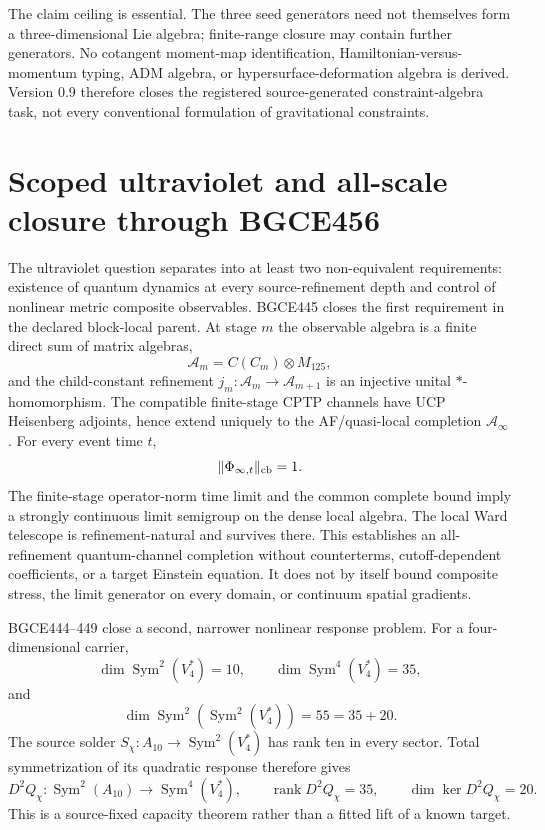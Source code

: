 \documentclass[11pt]{article}
\theoremstyle{definition}
\theoremstyle{remark}
\newcommand{\Sym}{\operatorname{Sym}}
\begin{document}
The claim ceiling is essential. The three seed generators need not themselves form a three-dimensional Lie algebra; finite-range closure may contain further generators. No cotangent moment-map identification, Hamiltonian-versus-momentum typing, ADM algebra, or hypersurface-deformation algebra is derived. Version 0.9 therefore closes the registered source-generated constraint-algebra task, not every conventional formulation of gravitational constraints.

\section{Scoped ultraviolet and all-scale closure through BGCE456}\label{sec:uv09}

The ultraviolet question separates into at least two non-equivalent requirements: existence of quantum dynamics at every source-refinement depth and control of nonlinear metric composite observables. BGCE445 closes the first requirement in the declared block-local parent. At stage $m$ the observable algebra is a finite direct sum of matrix algebras,
\begin{equation}
 \mathcal A_m=C(C_m)\otimes M_{125},
\end{equation}
and the child-constant refinement $j_m:\mathcal A_m\to\mathcal A_{m+1}$ is an injective unital $*$-homomorphism. The compatible finite-stage CPTP channels have UCP Heisenberg adjoints, hence extend uniquely to the AF/quasi-local completion $\mathcal A_\infty$. For every event time $t$,
\begin{equation}
 \lVert\Phi_{\infty,t}\rVert_{\rm cb}=1.
\end{equation}
The finite-stage operator-norm time limit and the common complete bound imply a strongly continuous limit semigroup on the dense local algebra. The local Ward telescope is refinement-natural and survives there. This establishes an all-refinement quantum-channel completion without counterterms, cutoff-dependent coefficients, or a target Einstein equation. It does not by itself bound composite stress, the limit generator on every domain, or continuum spatial gradients.

BGCE444--449 close a second, narrower nonlinear response problem. For a four-dimensional carrier,
\begin{equation}
 \dim\Sym^2(V_4^*)=10,
 \qquad
 \dim\Sym^4(V_4^*)=35,
\end{equation}
and
\begin{equation}
 \dim\Sym^2\!\left(\Sym^2(V_4^*)\right)=55=35+20.
\end{equation}
The source solder $S_\chi:A_{10}\to\Sym^2(V_4^*)$ has rank ten in every sector. Total symmetrization of its quadratic response therefore gives
\begin{equation}
 D^2Q_\chi:\Sym^2(A_{10})\longrightarrow\Sym^4(V_4^*),
 \qquad \operatorname{rank}D^2Q_\chi=35,
 \qquad \dim\ker D^2Q_\chi=20.
\end{equation}
This is a source-fixed capacity theorem rather than a fitted lift of a known target.
\end{document}

